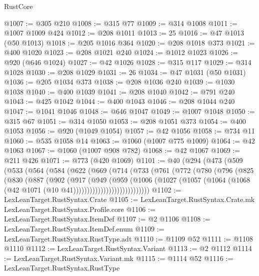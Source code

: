 \begin{lexlean}{RustCore}
\begin{coremodule}
@1007 := @305 @210
@1008 := @315 @77
@1009 := @314 @1008
@1011 := @1007 @1009 @424
@1012 := @208 @1011
@1013 := 25
@1016 := @47 @1013 (@50 @1013)
@1018 := @205 @1016 @364
@1020 := @208 @1018 @373
@1021 := @400 @1020
@1023 := @208 @1021 @240
@1024 := @1012 @1023
@1026 := @920 (@646 @1024)
@1027 := @42 @1026
@1028 := @315 @117
@1029 := @314 @1028
@1030 := @208 @1029
@1031 := 26
@1034 := @47 @1031 (@50 @1031)
@1036 := @205 @1034 @373
@1038 := @208 @1036 @240
@1039 := @1030 @1038
@1040 := @400 @1039
@1041 := @208 @1040
@1042 := @791 @240
@1043 := @425 @1042
@1044 := @400 @1043
@1046 := @208 @1044 @240
@1047 := @1041 @1046
@1048 := @646 @1047
@1049 := @1007 @1048
@1050 := @315 @67
@1051 := @314 @1050
@1053 := @208 @1051 @373
@1054 := @400 @1053
@1056 := @920 (@1049 @1054)
@1057 := @42 @1056
@1058 := @734 @11
@1060 := @535 @1058 @14
@1063 := @1060 (@1007 @775 @1009)
@1064 := @42 @1063
@1067 := @1060 (@1007 @908 @782)
@1068 := @42 @1067
@1069 := @211 @426
@1071 := @773 (@420 @1069)
@1101 := @40
    (@294
      (@473
        (@509
          (@533
            (@564
              (@584
                (@622
                  (@669
                    (@714
                      (@733
                        (@761
                          (@772
                            (@780
                              (@796
                                (@825
                                  (@830
                                    (@887
                                      (@902
                                        (@917
                                          (@949
                                            (@959
                                              (@1006
                                                (@1027
                                                  (@1057
                                                    (@1064
                                                      (@1068
                                                        (@42
                                                          @1071
                                                          (@10 @41))))))))))))))))))))))))))))
@1102 := LexLeanTarget.RustSyntax.Crate
@1105 := LexLeanTarget.RustSyntax.Crate.mk LexLeanTarget.RustSyntax.Profile.core
@1106 := LexLeanTarget.RustSyntax.ItemDef
@1107 := @2 @1106
@1108 := LexLeanTarget.RustSyntax.ItemDef.enum
@1109 := LexLeanTarget.RustSyntax.RustType.adt
@1110 := @1109 @52
@1111 := @1108 @1110
@1112 := LexLeanTarget.RustSyntax.Variant
@1113 := @2 @1112
@1114 := LexLeanTarget.RustSyntax.Variant.mk
@1115 := @1114 @52
@1116 := LexLeanTarget.RustSyntax.RustType

\end{coremodule}
\end{lexlean}
